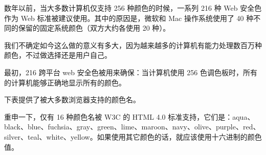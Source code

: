 数年以前，当大多数计算机仅支持 256 种颜色的时候，一系列 216 种 Web 安全色作为 Web 标准被建议使用。其中的原因是，微软和 Mac 操作系统使用了 40 种不同的保留的固定系统颜色（双方大约各使用 20 种）。

我们不确定如今这么做的意义有多大，因为越来越多的计算机有能力处理数百万种颜色，不过做选择还是用户自己。


最初，216 跨平台 web 安全色被用来确保：当计算机使用 256 色调色板时，所有的计算机能够正确地显示所有的颜色。

下表提供了被大多数浏览器支持的颜色名。

重申一下，仅有 16 种颜色名被 W3C 的 HTML 4.0 标准支持，它们是：aqua、black、blue、fuchsia、gray、green、lime、maroon、navy、olive、purple、red、silver、teal、white、yellow。如果使用其它颜色的话，就应该使用十六进制的颜色值。


